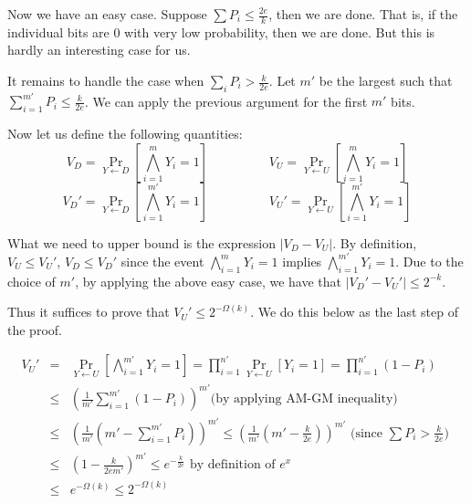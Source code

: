 Now we have an easy case. Suppose $\sum P_i \le \frac{2e}{k}$, then we are done. That is, if the individual bits are $0$ with very low probability, then we are done. But this is hardly an interesting case for us.

It remains to handle the case when $\sum_i P_i > \frac{k}{2e}$. Let $m'$ be the largest such that $\sum_{i=1}^{m'} P_i \le \frac{k}{2e}$. We can apply the previous argument for the first $m'$ bits.

Now let us define the following quantities:
$$ V_D = \Pr_{Y \leftarrow D} \left[ \bigwedge_{i=1}^m Y_i = 1 \right] \hspace{2cm} V_U = \Pr_{Y \leftarrow U} \left[ \bigwedge_{i=1}^m Y_i = 1 \right] $$
$$ V_D' = \Pr_{Y \leftarrow D} \left[ \bigwedge_{i=1}^{m'} Y_i = 1 \right] \hspace{2cm} V_U' = \Pr_{Y \leftarrow U} \left[ \bigwedge_{i=1}^{m'} Y_i = 1 \right] $$

What we need to upper bound is the expression $|V_D - V_U|$.
By definition, $V_U \le V_U'$, $V_D \le V_D'$ since the event $\bigwedge_{i=1}^m Y_i = 1$ implies $\bigwedge_{i=1}^{m'} Y_i = 1$. Due to the choice of $m'$, by applying the above easy case, we have that $|V_D'-V_U'| \le 2^{-k}$.

Thus it suffices to prove that $V_U' \le 2^{-\Omega(k)}$. We do this below as the last step of the proof.

\begin{eqnarray*}
V_U' & = & \Pr_{Y \leftarrow U} \left[ \bigwedge_{i=1}^{m'} Y_i = 1 \right] = \prod_{i=1}^{n'} \Pr_{Y \leftarrow U} \left[ Y_i = 1 \right] = \prod_{i=1}^{n'} \left(1-P_i\right) \\
& \le & \left(\frac{1}{m'} \sum_{i=1}^{m'} (1-P_i) \right)^{m'} \textrm {(by applying AM-GM inequality)} \\
& \le & \left(\frac{1}{m'} \left(m'-\sum_{i=1}^{m'} P_i\right) \right)^{m'} \le \left(\frac{1}{m'} \left(m'-\frac{k}{2e} \right) \right)^{m'} \textrm{ (since $\sum P_i > \frac{k}{2e}$) }\\
& \le & \left(1-\frac{k}{2em'}\right)^{m'} \le e^{-\frac{k}{2e}} \textrm{ by definition of $e^x$ } \\
& \le & e^{-\Omega(k)} \le 2^{-\Omega(k)}
\end{eqnarray*}

